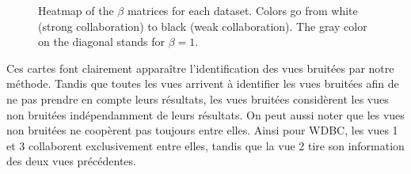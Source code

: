 \documentclass[a4paper]{article}
\begin{document}
\begin{figure}[!h]
	\centering
	\caption{Heatmap of the $\beta$ matrices for each dataset. Colors go from white (strong collaboration) to black (weak collaboration). The gray color on the diagonal stands for $\beta=1$.}
\label{fig:betas}
\end{figure}

Ces cartes font clairement apparaître l'identification des vues bruitées par notre méthode. Tandis que toutes les vues arrivent à identifier les vues bruitées afin de ne pas prendre en compte leurs résultats, les vues bruitées considèrent les vues non bruitées indépendamment de leurs résultats. On peut aussi noter que les vues non bruitées ne coopèrent pas toujours entre elles. Ainsi pour WDBC, les vues 1 et 3 collaborent exclusivement entre elles, tandis que la vue 2 tire son information des deux vues précédentes.
\end{document}
